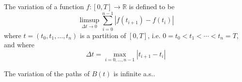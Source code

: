 \begin{definition}[Variation]
    The variation of a function $f:[0,T]\rightarrow\mathbb{R}$ is defined to be
    \begin{equation}
        \limsup_{\Delta t\rightarrow 0}\sum_{i=0}^{n-1}\left|f\left(t_{i+1}\right)-f\left(t_{i}\right)\right|
    \end{equation}
    where $t=\left(t_{0},t_{1},\ldots,t_{n}\right)$ is a partition of $[0,T]$, i.e. $0=t_{0}<t_{1}<\cdots<t_{n}=T$, and where
    \begin{equation}
        \Delta t=\max_{i=0,\ldots,n-1}\left|t_{i+1}-t_{i}\right|
    \end{equation}
\end{definition}

\begin{theorem}
    The variation of the paths of $B(t)$ is infinite a.s..
\end{theorem}


